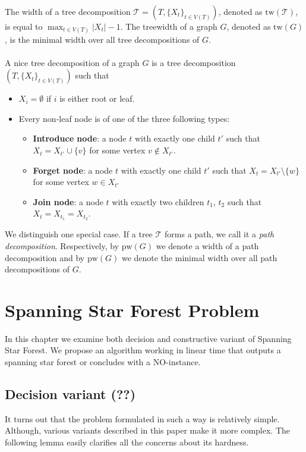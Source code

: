 \documentclass[en]{pracamgr}
\newcommand{\ssf}{spanning star forest}
\newcommand{\ssfp}{{\sc Spanning Star Forest}}
\begin{document}
The width of a tree decomposition $\mathcal{T} = (T,\{X_t\}_{t\in V(T)})$, denoted as $\textrm{tw}(\mathcal{T})$, is equal to $\max_{t \in V(T)} |X_t| - 1$. The treewidth of a graph $G$, denoted as $\textrm{tw}(G)$, is the minimal width over all tree decompositions of $G$.
\\\\
A nice tree decomposition of a graph $G$ is a tree decomposition $(T, \{X_t\}_{t \in V(T)})$ such that
\begin{itemize}
	\item $X_i = \emptyset$ if $i$ is either root or leaf.
	\item Every non-leaf node is of one of the three following types:
	\begin{itemize}
		\item \textbf{Introduce node}: a node $t$ with exactly one child $t'$ such that $X_t = X_{t'} \cup \{v\}$ for some vertex $v \notin X_{t'}$.
		\item \textbf{Forget node}: a node $t$ with exactly one child $t'$ such that $X_t = X_{t'} \setminus \{w\}$ for some vertex $w \in X_{t'}$
		\item \textbf{Join node}: a node $t$ with exactly two children $t_1$, $t_2$ such that $X_t = X_{t_1} = X_{t_2}$.
	\end{itemize}
\end{itemize}

We distinguish one special case. If a tree $\mathcal{T}$ forms a path, we call it a \emph{path decomposition}. Respectively, by $\textrm{pw}(G)$ we denote a width of a path decomposition and by $\textrm{pw}(G)$ we denote the minimal width over all path decompositions of $G$.

\chapter{Spanning Star Forest Problem}

In this chapter we examine both decision and constructive variant of \ssfp{}. We propose an algorithm working in linear time that outputs a \ssf{} or concludes with a NO-instance.

\section{Decision variant (??)}

It turns out that the problem formulated in such a way is relatively simple. Although, various variants described in this paper make it more complex. The following lemma easily clarifies all the concerns about its hardness.
\end{document}
